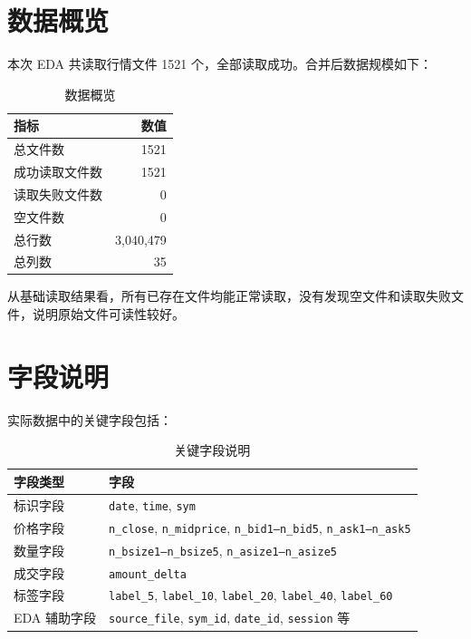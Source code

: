 \documentclass[UTF8,a4paper,12pt]{ctexart}
\begin{document}
\section{数据概览}

本次 EDA 共读取行情文件 1521 个，全部读取成功。合并后数据规模如下：

\begin{table}[H]
\centering
\caption{数据概览}
\begin{tabular}{lr}
\toprule
指标 & 数值 \\
\midrule
总文件数 & 1521 \\
成功读取文件数 & 1521 \\
读取失败文件数 & 0 \\
空文件数 & 0 \\
总行数 & 3,040,479 \\
总列数 & 35 \\
\bottomrule
\end{tabular}
\end{table}

从基础读取结果看，所有已存在文件均能正常读取，没有发现空文件和读取失败文件，说明原始文件可读性较好。

\section{字段说明}

实际数据中的关键字段包括：

\begin{table}[H]
\centering
\caption{关键字段说明}
\begin{tabular}{ll}
\toprule
字段类型 & 字段 \\
\midrule
标识字段 & \texttt{date}, \texttt{time}, \texttt{sym} \\
价格字段 & \texttt{n\_close}, \texttt{n\_midprice}, \texttt{n\_bid1--n\_bid5}, \texttt{n\_ask1--n\_ask5} \\
数量字段 & \texttt{n\_bsize1--n\_bsize5}, \texttt{n\_asize1--n\_asize5} \\
成交字段 & \texttt{amount\_delta} \\
标签字段 & \texttt{label\_5}, \texttt{label\_10}, \texttt{label\_20}, \texttt{label\_40}, \texttt{label\_60} \\
EDA 辅助字段 & \texttt{source\_file}, \texttt{sym\_id}, \texttt{date\_id}, \texttt{session} 等 \\
\bottomrule
\end{tabular}
\end{table}
\end{document}
